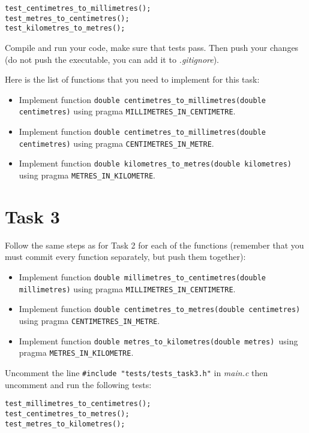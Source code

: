 \documentclass{article}
\begin{document}
\begin{lstlisting}
test_centimetres_to_millimetres();
test_metres_to_centimetres();
test_kilometres_to_metres();
\end{lstlisting}

Compile and run your code, make sure that tests pass. Then push your changes (do not push the executable, you can add it to \emph{.gitignore}).

Here is the list of functions that you need to implement for this task:

\begin{itemize}
\item Implement function \lstinline{double centimetres_to_millimetres(double centimetres)} using pragma \lstinline{MILLIMETRES_IN_CENTIMETRE}.
\item Implement function \lstinline{double centimetres_to_millimetres(double centimetres)} using pragma \lstinline{CENTIMETRES_IN_METRE}.
\item Implement function \lstinline{double kilometres_to_metres(double kilometres)} using pragma \lstinline{METRES_IN_KILOMETRE}.
\end{itemize}

\section*{Task 3}

Follow the same steps as for Task 2 for each of the functions (remember that you must commit every function separately, but push them together):

\begin{itemize}
\item Implement function \lstinline{double millimetres_to_centimetres(double millimetres)} using pragma \lstinline{MILLIMETRES_IN_CENTIMETRE}.
\item Implement function \lstinline{double centimetres_to_metres(double centimetres)} using pragma \lstinline{CENTIMETRES_IN_METRE}.
\item Implement function \lstinline{double metres_to_kilometres(double metres) }using pragma \lstinline{METRES_IN_KILOMETRE}.
\end{itemize}

Uncomment the line \lstinline{#include "tests/tests_task3.h"} in \emph{main.c} then uncomment and run the following tests:

\begin{lstlisting}
test_millimetres_to_centimetres();
test_centimetres_to_metres();
test_metres_to_kilometres();
\end{lstlisting}
\end{document}
